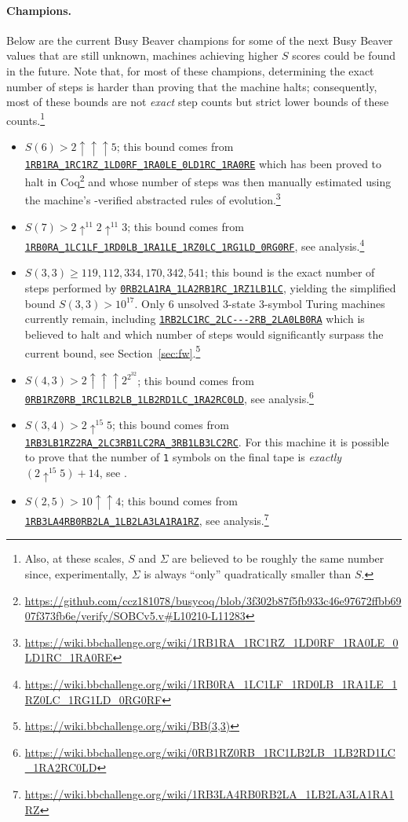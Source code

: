 \documentclass[letterpaper,british,11pt]{article}
\theoremstyle{definition} %
\numberwithin{equation}{section}
\theoremstyle{definition} %
\newcommand{\tm}[1]{\href{https://bbchallenge.org/#1}{\texttt{\nolinkurl{#1}}}}
\newcommand{\sone}{\texttt{1}\xspace}
\begin{document}
\paragraph{Champions.} Below are the current Busy Beaver champions for some of the next Busy Beaver values that are still unknown, \ie machines achieving higher $S$ scores could be found in the future. Note that, for most of these champions, determining the exact number of steps is harder than proving that the machine halts; consequently, most of these bounds are not \textit{exact} step counts but strict lower bounds of these counts.\footnote{Also, at these scales, $S$ and $\Sigma$ are believed to be roughly the same number since, experimentally, $\Sigma$ is always ``only'' quadratically smaller than $S$.}
\begin{itemize}
    \item $S(6) > 2 \uparrow \uparrow \uparrow 5$; this bound comes from \tm{1RB1RA_1RC1RZ_1LD0RF_1RA0LE_0LD1RC_1RA0RE} which has been proved to halt in Coq\footnote{\url{https://github.com/ccz181078/busycoq/blob/3f302b87f5fb933c46e97672ffbb6907f373fb6e/verify/SOBCv5.v\#L10210-L11283}} and whose number of steps was then manually estimated using the machine's \Coq-verified abstracted rules of evolution.\footnote{\url{https://wiki.bbchallenge.org/wiki/1RB1RA_1RC1RZ_1LD0RF_1RA0LE_0LD1RC_1RA0RE}}
    \item $S(7) > 2 \uparrow^{11} 2 \uparrow^{11} 3$; this bound comes from \tm{1RB0RA_1LC1LF_1RD0LB_1RA1LE_1RZ0LC_1RG1LD_0RG0RF}, see analysis.\footnote{\url{https://wiki.bbchallenge.org/wiki/1RB0RA_1LC1LF_1RD0LB_1RA1LE_1RZ0LC_1RG1LD_0RG0RF}}
    \item $S(3,3) \geq 119{,}112{,}334{,}170{,}342{,}541$; this bound is the exact number of steps performed by \tm{0RB2LA1RA_1LA2RB1RC_1RZ1LB1LC}, yielding the simplified bound $S(3,3) > 10^{17}$. Only 6 unsolved 3-state 3-symbol Turing machines currently remain, including \tm{1RB2LC1RC_2LC---2RB_2LA0LB0RA} which is believed to halt and which number of steps would significantly surpass the current bound, see Section~\ref{sec:fw}.\footnote{\url{https://wiki.bbchallenge.org/wiki/BB(3,3)}}
    \item $S(4,3) > 2 \uparrow \uparrow \uparrow 2^{2^{32}}$; this bound comes from \tm{0RB1RZ0RB_1RC1LB2LB_1LB2RD1LC_1RA2RC0LD}, see analysis.\footnote{\url{https://wiki.bbchallenge.org/wiki/0RB1RZ0RB_1RC1LB2LB_1LB2RD1LC_1RA2RC0LD}}
    \item $S(3,4) > 2 \uparrow^{15} 5$; this bound comes from \tm{1RB3LB1RZ2RA_2LC3RB1LC2RA_3RB1LB3LC2RC}. For this machine it is possible to prove that the number of \sone symbols on the final tape is \textit{exactly} $(2 \uparrow^{15} 5) + 14$, see \cite{ligocki2024bb34ack14}.
    \item $S(2,5) > 10 \uparrow \uparrow 4$; this bound comes from \tm{1RB3LA4RB0RB2LA_1LB2LA3LA1RA1RZ}, see analysis.\footnote{\url{https://wiki.bbchallenge.org/wiki/1RB3LA4RB0RB2LA_1LB2LA3LA1RA1RZ}}
\end{itemize}
\end{document}
